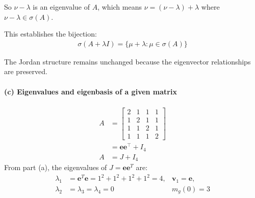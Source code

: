 So $\nu - \lambda$ is an eigenvalue of $A$, which means $\nu = (\nu - \lambda) + \lambda$ where $\nu - \lambda \in \sigma(A)$.

This establishes the bijection:
\begin{align*}
    \sigma\left(A+ \lambda I\right) = \{\mu + \lambda : \mu \in \sigma(A)\}
\end{align*}

The Jordan structure remains unchanged because the eigenvector relationships are preserved.

\paragraph*{(c) Eigenvalues and eigenbasis of a given matrix}
\begin{align*}
    A & = \begin{bmatrix}
              2 & 1 & 1 & 1 \\
              1 & 2 & 1 & 1 \\
              1 & 1 & 2 & 1 \\
              1 & 1 & 1 & 2
          \end{bmatrix}                  \\
      & = \mathbf{e}\mathbf{e}^\top + I_4 \\
    A & = J + I_4
\end{align*}
From part (a), the eigenvalues of $J = \mathbf{e}\mathbf{e}^T$ are:
\begin{align*}
    \lambda_1 & = \mathbf{e}^T\mathbf{e} = 1^2 + 1^2 + 1^2 + 1^2 = 4, & \mathbf{\mathbf{v}}_1 = \mathbf{e}, \\
    \lambda_2 & = \lambda_3 = \lambda_4 = 0                           & m_g(0) = 3
\end{align*}


